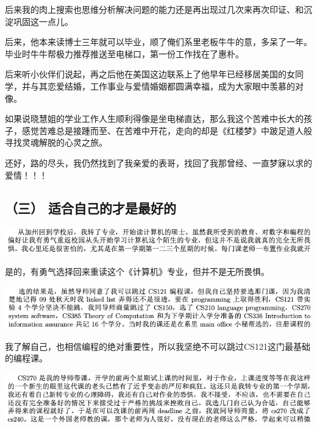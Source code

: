 \documentclass[9pt, b5paper]{article}
\begin{document}
后来我的肉上搜索也思维分析解决问题的能力还是再出现过几次来再次印证、和沉淀巩固这一点儿。 

后来，他本来读博士三年就可以毕业，顺了俺们系里老板牛牛的意，多呆了一年。毕业时牛牛帮极力推荐推送至电梯口，第一份工作找在了惠朴。

后来听小伙伴们说起，再之后他在美国这边联系上了他早年已经移居美国的女同学，并与其恋爱结婚，工作事业与爱情婚姻都圆满幸福，成为大家眼中羡慕的对像。 

如果说晓慧姐的学业工作人生顺利得像是坐电梯直达，那么我这个苦难中长大的孩子，感觉苦难总是接踵而至、在苦难中开花，走向的却是《红楼梦》中跛足道人般寻找灵魂解脱的心灵之旅。

还好，路的尽头，我仍然找到了我亲爱的表哥，找回了我那曾经、一直梦寐以求的爱情！！！

\subsection{（三） 适合自己的才是最好的}
\label{sec:org5bfb2dc}

\begin{center}
\includegraphics[width=.9\linewidth]{./pic/backups_plans_20210425_112131.png}
\end{center}

是的，有勇气选择回来重读这个《计算机》专业，但并不是无所畏惧。

\begin{center}
\includegraphics[width=.9\linewidth]{./pic/backups_plans_20210424_203000.png}
\end{center}

我了解自己，也相信编程的绝对重要性，所以我坚绝不可以跳过CS121这门最基础的编程课。

\begin{center}
\includegraphics[width=.9\linewidth]{./pic/backups_plans_20210424_203059.png}
\end{center}
\end{document}
